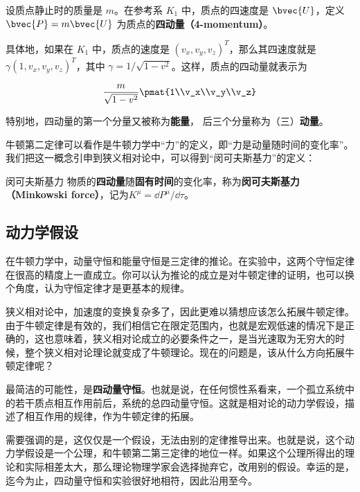 设质点静止时的质量是 $m$。在参考系 $K_1$ 中，质点的四速度是 $\bvec{U}$，定义 $\bvec{P}=m\bvec{U}$ 为质点的\textbf{四动量（4-momentum）}。

具体地，如果在 $K_1$ 中，质点的速度是 $(v_x, v_y, v_z)^T$，那么其四速度就是 $\gamma(1, v_x, v_y, v_z)^T$，其中 $\gamma=1/\sqrt{1-v^2}$。这样，质点的四动量就表示为

\begin{equation}
\frac{m}{\sqrt{1-v^2}}\pmat{1\\v_x\\v_y\\v_z}
\end{equation}

特别地，四动量的第一个分量又被称为\textbf{能量}， 后三个分量称为（三）\textbf{动量}。

牛顿第二定律可以看作是牛顿力学中“力”的定义，即“力是动量随时间的变化率”。我们把这一概念引申到狭义相对论中，可以得到“闵可夫斯基力”的定义：

\begin{definition}{闵可夫斯基力}
物质的\textbf{四动量}随\textbf{固有时间}的变化率，称为\textbf{闵可夫斯基力（Minkowski force）}，记为$K^{\mu}=\dd P^\mu/\dd\tau$。
\end{definition}


\subsection{动力学假设}

在牛顿力学中，动量守恒和能量守恒是三定律的推论。在实验中，这两个守恒定律在很高的精度上一直成立。你可以认为推论的成立是对牛顿定律的证明，也可以换个角度，认为守恒定律才是更基本的规律。

狭义相对论中，加速度的变换复杂多了，因此更难以猜想应该怎么拓展牛顿定律。由于牛顿定律是有效的，我们相信它在限定范围内，也就是宏观低速的情况下是正确的，这也意味着，狭义相对论成立的必要条件之一，是当光速取为无穷大的时候，整个狭义相对论理论就变成了牛顿理论。现在的问题是，该从什么方向拓展牛顿定律呢？

最简洁的可能性，是\textbf{四动量守恒}。也就是说，在任何惯性系看来，一个孤立系统中的若干质点相互作用前后，系统的总四动量守恒。这就是相对论的动力学假设，描述了相互作用的规律，作为牛顿定律的拓展。

需要强调的是，这仅仅是一个假设，无法由别的定律推导出来。也就是说，这个动力学假设是一个公理，和牛顿第二第三定律的地位一样。如果这个公理所得出的理论和实际相差太大，那么理论物理学家会选择抛弃它，改用别的假设。幸运的是，迄今为止，四动量守恒和实验很好地相符，因此沿用至今。




